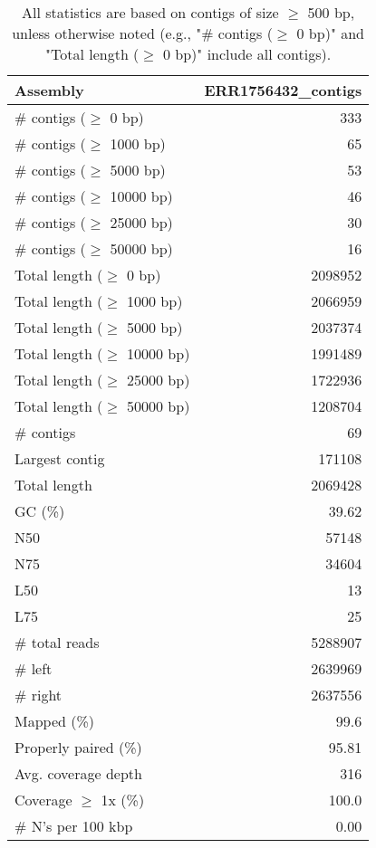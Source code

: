 \documentclass[12pt,a4paper]{article}
\begin{document}
\begin{table}[ht]
\begin{center}
\caption{All statistics are based on contigs of size $\geq$ 500 bp, unless otherwise noted (e.g., "\# contigs ($\geq$ 0 bp)" and "Total length ($\geq$ 0 bp)" include all contigs).}
\begin{tabular}{|l*{1}{|r}|}
\hline
Assembly & ERR1756432\_contigs \\ \hline
\# contigs ($\geq$ 0 bp) & 333 \\ \hline
\# contigs ($\geq$ 1000 bp) & 65 \\ \hline
\# contigs ($\geq$ 5000 bp) & 53 \\ \hline
\# contigs ($\geq$ 10000 bp) & 46 \\ \hline
\# contigs ($\geq$ 25000 bp) & 30 \\ \hline
\# contigs ($\geq$ 50000 bp) & 16 \\ \hline
Total length ($\geq$ 0 bp) & 2098952 \\ \hline
Total length ($\geq$ 1000 bp) & 2066959 \\ \hline
Total length ($\geq$ 5000 bp) & 2037374 \\ \hline
Total length ($\geq$ 10000 bp) & 1991489 \\ \hline
Total length ($\geq$ 25000 bp) & 1722936 \\ \hline
Total length ($\geq$ 50000 bp) & 1208704 \\ \hline
\# contigs & 69 \\ \hline
Largest contig & 171108 \\ \hline
Total length & 2069428 \\ \hline
GC (\%) & 39.62 \\ \hline
N50 & 57148 \\ \hline
N75 & 34604 \\ \hline
L50 & 13 \\ \hline
L75 & 25 \\ \hline
\# total reads & 5288907 \\ \hline
\# left & 2639969 \\ \hline
\# right & 2637556 \\ \hline
Mapped (\%) & 99.6 \\ \hline
Properly paired (\%) & 95.81 \\ \hline
Avg. coverage depth & 316 \\ \hline
Coverage $\geq$ 1x (\%) & 100.0 \\ \hline
\# N's per 100 kbp & 0.00 \\ \hline
\end{tabular}
\end{center}
\end{table}
\end{document}
